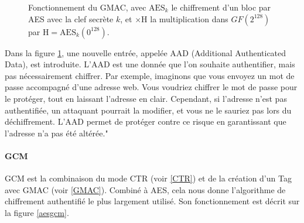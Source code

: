 \documentclass[a4paper, 12pt]{article}
\begin{document}
\begin{figure}[h]
\caption{Fonctionnement du GMAC, avec $\text{AES}_k$ le chiffrement d'un bloc par AES avec la clef secrète $k$, et $\times \text{H}$ la multiplication dans \hyperref[GF]{$GF$}$\left(2^{128}\right)$ par $\text{H} = \text{AES}_k\left({0}^{128}\right)$.}
\label{gmac}
\end{figure}

Dans la figure \ref{gmac}, une nouvelle entrée, appelée AAD (Additional Authenticated Data), est introduite. L'AAD est une donnée que l'on souhaite authentifier, mais pas nécessairement chiffrer. Par exemple, imaginons que vous envoyez un mot de passe accompagné d'une adresse web. Vous voudriez chiffrer le mot de passe pour le protéger, tout en laissant l'adresse en clair. Cependant, si l'adresse n'est pas authentifiée, un attaquant pourrait la modifier, et vous ne le sauriez pas lors du déchiffrement. L'AAD permet de protéger contre ce risque en garantissant que l'adresse n'a pas été altérée."

\paragraph{GCM}

GCM est la combinaison du mode CTR (voir \ref{CTR}) et de la création d'un Tag avec GMAC (voir \ref{GMAC}). Combiné à AES, cela nous donne l'algorithme de chiffrement authentifié le plus largement utilisé. Son fonctionnement est décrit sur la figure \ref{aesgcm}.
\end{document}
